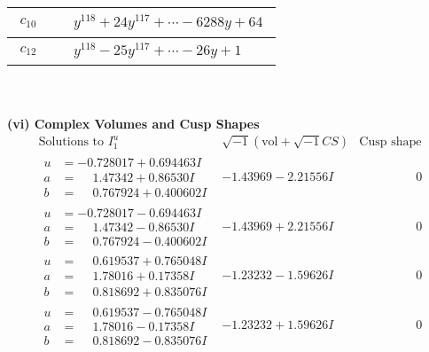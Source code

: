 \documentclass[1p]{elsarticle_modified}
\theoremstyle{definition}
\newcommand{\I}{\sqrt{-1}}
\begin{document}
\begin{tabular}{m{50pt}|m{274pt}}
\hline $$\begin{aligned}c_{10}\end{aligned}$$&$\begin{aligned}
&y^{118}+24 y^{117}+\cdots-6288 y+64
\end{aligned}$\\
\hline $$\begin{aligned}c_{12}\end{aligned}$$&$\begin{aligned}
&y^{118}-25 y^{117}+\cdots-26 y+1
\end{aligned}$\\
\hline
\end{tabular}\\~\\
\newpage\flushleft \textbf{(vi) Complex Volumes and Cusp Shapes}
$$\begin{array}{c|c|c}  
\text{Solutions to }I^u_{1}& \I (\text{vol} + \sqrt{-1}CS) & \text{Cusp shape}\\
 \hline 
\begin{aligned}
u &= -0.728017 + 0.694463 I \\
a &= \phantom{-}1.47342 + 0.86530 I \\
b &= \phantom{-}0.767924 + 0.400602 I\end{aligned}
 & -1.43969 - 2.21556 I & \phantom{-0.000000 } 0 \\ \hline\begin{aligned}
u &= -0.728017 - 0.694463 I \\
a &= \phantom{-}1.47342 - 0.86530 I \\
b &= \phantom{-}0.767924 - 0.400602 I\end{aligned}
 & -1.43969 + 2.21556 I & \phantom{-0.000000 } 0 \\ \hline\begin{aligned}
u &= \phantom{-}0.619537 + 0.765048 I \\
a &= \phantom{-}1.78016 + 0.17358 I \\
b &= \phantom{-}0.818692 + 0.835076 I\end{aligned}
 & -1.23232 - 1.59626 I & \phantom{-0.000000 } 0 \\ \hline\begin{aligned}
u &= \phantom{-}0.619537 - 0.765048 I \\
a &= \phantom{-}1.78016 - 0.17358 I \\
b &= \phantom{-}0.818692 - 0.835076 I\end{aligned}
 & -1.23232 + 1.59626 I & \phantom{-0.000000 } 0 \\ \hline\begin{aligned}

\end{aligned}
\end{array}$$
\end{document}
